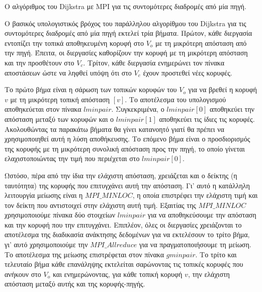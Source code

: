 \documentclass[12pt,a4paper]{article} %
\begin{document}
{\raggedright{} Ο αλγόριθμος του Dijkstra με MPI για τις συντομότερες διαδρομές από μία πηγή.\label{alg:dijkstra2}\par
\vspace{0.3cm}

Ο βασικός υπολογιστικός βρόχος του παράλληλου αλγορίθμου του Dijkstra για τις συντομότερες διαδρομές από μία πηγή εκτελεί τρία βήματα. Πρώτον, κάθε διεργασία εντοπίζει την τοπικά αποθηκευμένη κορυφή στο $V_o$ με τη μικρότερη απόσταση από την πηγή. Έπειτα, οι διεργασίες καθορίζουν την κορυφή με τη μικρότερη απόσταση και την προσθέτουν στο $V_c$. Τρίτον, κάθε διεργασία ενημερώνει τον πίνακα αποστάσεων ώστε να ληφθεί υπόψη ότι στο $V_c$ έχουν προστεθεί νέες κορυφές.

Το πρώτο βήμα είναι η σάρωση των τοπικών κορυφών του $V_o$ για να βρεθεί η κορυφή $v$ με τη μικρότερη τοπική απόσταση $[v]$. Το αποτέλεσμα του υπολογισμού αποθηκεύεται στον πίνακα \texttt{$lminpair$}. Συγκεκριμένα, ο \texttt{$lminpair[0]$} αποθηκεύει την απόσταση μεταξύ των κορυφών και ο \texttt{$lminpair[1]$} αποθηκεύει τις ίδιες τις κορυφές. Ακολουθώντας τα παρακάτω βήματα θα γίνει κατανοητό γιατί θα πρέπει να χρησιμοποιηθεί αυτή η λύση αποθήκευσης. Το επόμενο βήμα είναι ο προσδιορισμός της κορυφής με τη μικρότερη συνολική απόσταση προς την πηγή, το οποίο γίνεται ελαχιστοποιώντας την τιμή που περιέχεται στο \texttt{$lminpair[0]$}.

Ωστόσο, πέρα από την ίδια την ελάχιστη απόσταση, χρειάζεται και ο δείκτης (η ταυτότητα) της κορυφής που επιτυγχάνει αυτή την απόσταση. Γι' αυτό η κατάλληλη λειτουργία μείωσης είναι η \texttt{$MPI\_MINLOC$}, η οποία επιστρέφει την ελάχιστη τιμή και τον δείκτη που αντιστοιχεί στην ελάχιστη αυτή τιμή. Εξαιτίας της \texttt{$MPI\_MINLOC$} χρησιμοποιούμε πίνακα δύο στοιχείων \texttt{$lminpair$} για να αποθηκεύσουμε την απόσταση και την κορυφή που την επιτυγχάνει. Επιπλέον, όλες οι διεργασίες χρειάζονται το αποτέλεσμα της διαδικασία ανάκτησης δεδομένων για να εκτελέσουν το τρίτο βήμα, γι' αυτό χρησιμοποιούμε την \texttt{$MPI\_Allreduce$} για να πραγματοποιήσουμε τη μείωση. Το αποτέλεσμα της μείωσης επιστρέφεται στον πίνακα \texttt{$gminpair$}. Το τρίτο και τελευταίο βήμα κάθε επανάληψης εκτελείται σαρώνοντας τις τοπικές κορυφές που ανήκουν στο $V_o$ και ενημερώνοντας, για κάθε τοπική κορυφή $v$, την ελάχιστη απόσταση μεταξύ αυτής και της κορυφής-πηγής.

}
\end{document}
